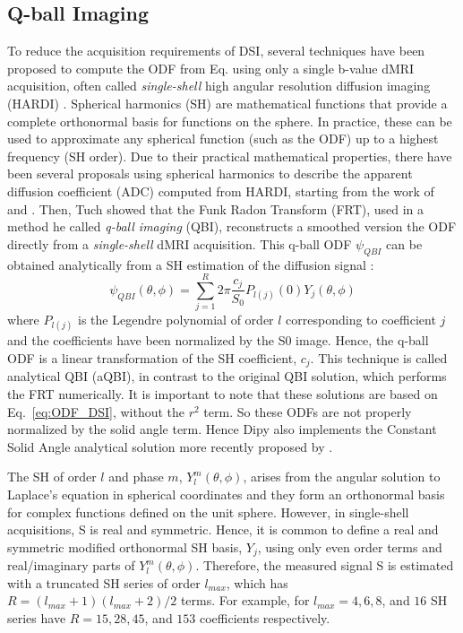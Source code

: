 \documentclass{bioinfo}
\begin{document}
\subsection{Q-ball Imaging}
To reduce the acquisition requirements of DSI, several techniques
have been proposed to compute the ODF from Eq. \label{eq:ODF_DSI}
using only a single b-value dMRI acquisition, often called
\emph{single-shell} high angular resolution diffusion imaging (HARDI)
\citep{tuch-reese-etal:02,descoteaux-deriche-etal:11}.
Spherical harmonics (SH) are mathematical functions that provide 
a complete orthonormal basis for functions on the sphere. In practice, these
can be used to approximate any spherical function (such as the ODF) up to a
highest frequency (SH order). Due to their practical mathematical properties,
there have been several proposals using spherical harmonics to describe
the apparent diffusion coefficient (ADC) computed from HARDI, starting from the
work of \citet{Frank2001, Frank2002, alexander-barker-etal:02} and
\citet{tuch-reese-etal:02}. Then, Tuch showed that the Funk Radon Transform
(FRT), used in a method he called \emph{q-ball imaging} (QBI),
reconstructs a smoothed version the ODF directly from a
\emph{single-shell} dMRI acquisition. This q-ball ODF $\psi_{QBI}$ can
be obtained analytically from a
SH estimation of the diffusion signal \citep{descoteaux-angelino-etal:07,
  hess-mukherjee-etal:06, anderson:05}:
\begin{equation}\label{eq.qball}
\psi_{QBI}(\theta, \phi) = \sum_{j=1}^{R} 2\pi \frac{c_j}{S_0} P_{l(j)} (0) Y_{j} (\theta, \phi)
\end{equation}
where $P_{l(j)}$ is the Legendre polynomial of order $l$ corresponding to
coefficient $j$ and the coefficients have been normalized by the S0
image. Hence, the q-ball ODF is a linear transformation of the SH coefficient,
$c_j$. This technique is called analytical QBI (aQBI), in contrast to the
original QBI solution, which performs the FRT numerically. It is
important to note that these solutions are based on
Eq.~\ref{eq:ODF_DSI}, without the $r^2$ term. So these ODFs are
not properly normalized by the solid angle term. Hence Dipy also implements
the Constant Solid Angle analytical solution more recently proposed by
\citep{aganj-lenglet-etal:10,tristan-vega-westin-etal:09}.

The SH of order $l$
and phase $m$, $Y_{l}^{m}(\theta, \phi)$, arises from the angular solution to
Laplace's equation in spherical coordinates and they form an orthonormal basis
for complex functions defined on the unit sphere. However, in single-shell
acquisitions, S is real and symmetric. Hence, it is common to define a real and
symmetric modified orthonormal SH basis, $Y_{j}$, using only even order terms
and real/imaginary parts of $Y_{l}^{m}(\theta, \phi)$. Therefore, the measured
signal S is estimated with a truncated SH series of order $l_{max}$, which has
$R = (l_{max} +1)( l_{max} +2)/2$ terms. For example, for $l_{max} = 4, 6, 8$,
and $16$ SH series have $R = 15, 28, 45$, and $153$ coefficients respectively.
\end{document}
